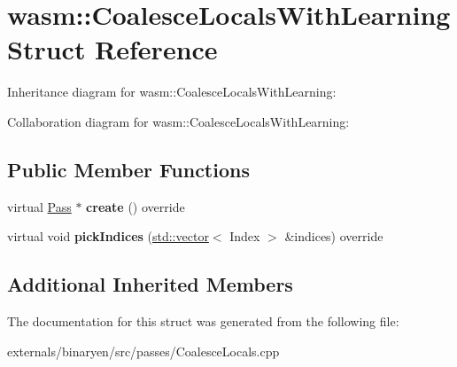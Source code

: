 \hypertarget{structwasm_1_1_coalesce_locals_with_learning}{}\section{wasm\+:\+:Coalesce\+Locals\+With\+Learning Struct Reference}
\label{structwasm_1_1_coalesce_locals_with_learning}


Inheritance diagram for wasm\+:\+:Coalesce\+Locals\+With\+Learning\+:


Collaboration diagram for wasm\+:\+:Coalesce\+Locals\+With\+Learning\+:
\subsection*{Public Member Functions}
\begin{DoxyCompactItemize}
\item 
\mbox{\label{structwasm_1_1_coalesce_locals_with_learning_a7ce2caad34c303080c7208153b8577af}} 
virtual \mbox{\hyperlink{classwasm_1_1_pass}{Pass}} $\ast$ {\bfseries create} () override
\item 
\mbox{\label{structwasm_1_1_coalesce_locals_with_learning_a2074e7f17d6d4c5b22ac56d0ac3737ac}} 
virtual void {\bfseries pick\+Indices} (\mbox{\hyperlink{classstd_1_1vector}{std\+::vector}}$<$ Index $>$ \&indices) override
\end{DoxyCompactItemize}
\subsection*{Additional Inherited Members}


The documentation for this struct was generated from the following file\+:\begin{DoxyCompactItemize}
\item 
externals/binaryen/src/passes/Coalesce\+Locals.\+cpp\end{DoxyCompactItemize}
